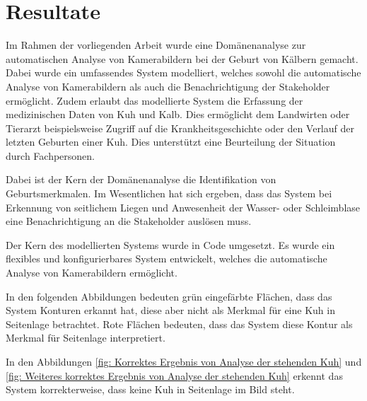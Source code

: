 

\chapter{Resultate}


Im Rahmen der vorliegenden Arbeit wurde eine Domänenanalyse zur automatischen Analyse von Kamerabildern bei der Geburt von Kälbern gemacht. Dabei wurde ein umfassendes System modelliert, welches sowohl die automatische Analyse von Kamerabildern als auch die Benachrichtigung der Stakeholder ermöglicht. Zudem erlaubt das modellierte System die Erfassung der medizinischen Daten von Kuh und Kalb. Dies ermöglicht dem Landwirten oder Tierarzt beispielsweise Zugriff auf die Krankheitsgeschichte oder den Verlauf der letzten Geburten einer Kuh. Dies unterstützt eine Beurteilung der Situation durch Fachpersonen. 

Dabei ist der Kern der Domänenanalyse die Identifikation von Geburtsmerkmalen. Im Wesentlichen hat sich ergeben, dass das System bei Erkennung von seitlichem Liegen und Anwesenheit der Wasser- oder Schleimblase eine Benachrichtigung an die Stakeholder auslösen muss. 

Der Kern des modellierten Systems wurde in Code umgesetzt. Es wurde ein flexibles und konfigurierbares System entwickelt, welches die automatische Analyse von Kamerabildern ermöglicht.

In den folgenden Abbildungen bedeuten grün eingefärbte Flächen, dass das System Konturen erkannt hat, diese aber nicht als Merkmal für eine Kuh in Seitenlage betrachtet. Rote Flächen bedeuten, dass das System diese Kontur als Merkmal für Seitenlage interpretiert.

In den Abbildungen \ref{fig: Korrektes Ergebnis von Analyse der stehenden Kuh} und \ref{fig: Weiteres korrektes Ergebnis von Analyse der stehenden Kuh} erkennt das System korrekterweise, dass keine Kuh in Seitenlage im Bild steht.

